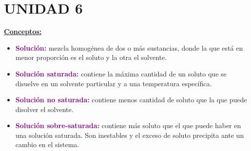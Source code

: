 \saltoPag{}
\section{UNIDAD 6}
    \textbf{\underline{Conceptos:}}
    \begin{itemize}
        \item \textcolor{purple}{\textbf{Solución:}} mezcla homogénea de dos o más sustancias, donde la que está en menor proporción es el soluto y la otra el solvente.
        \item \textcolor{purple}{\textbf{Solución saturada:}} contiene la máxima cantidad de un soluto que se disuelve en un solvente particular y a una temperatura específica.
        \item \textcolor{purple}{\textbf{Solución no saturada:}} contiene menos cantidad de soluto que la que puede disolver el solvente.
        \item \textcolor{purple}{\textbf{Solución sobre-saturada:}} contiene más soluto que el que puede haber en una solución saturada. Son inestables y el exceso de soluto precipita ante un cambio en el sistema.
    \end{itemize}
